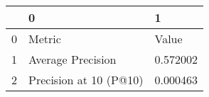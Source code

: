 \begin{tabular}{lll}
\toprule
{} &                       0 &         1 \\
\midrule
0 &                  Metric &     Value \\
1 &       Average Precision &  0.572002 \\
2 &  Precision at 10 (P@10) &  0.000463 \\
\bottomrule
\end{tabular}
